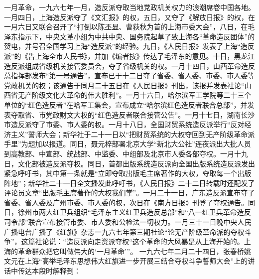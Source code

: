 \begin{maonote}
一月革命，一九六七年一月，造反派夺取当地党政机关权力的浪潮席卷中国各地。一月四日，上海造反派夺了《文汇报》的权，五日，又夺了《解放日报》的权，在一月六日又联合召开了“打倒以陈丕显、曹荻秋为首的上海市委大会”，八日，在毛泽东指示下，中央文革小组为中共中央、国务院起草了致上海各“革命造反团体”的贺电，并号召全国学习上海“造反派”的经验。九日，《人民日报》发表了上海“造反派”的《告上海全市人民书》，并加《编者按》传达了毛泽东的意见。十日，黑龙江造反派组成省级机关接管委员会，夺了省级机关的权。一月十四日，山西革命造反总指挥部发布“第一号通告”，宣布已于十二日夺了省委、省人委、市委、市人委等党政机关的权；该通告于同月二十五日在《人民日报》刊出，该报并发表社论“山西省无产阶级文化大革命的伟大胜利”。一月十六日，哈尔滨军工学院等二十三个单位的“红色造反者”在哈军工集会，宣布成立“哈尔滨红色造反者联合总部”，并发表夺取省、市党政财文大权的“红色造反者联合接管公告”。一月十七日，湖南长沙市造反派夺了市委、市人委的权。一月十八日，全国财贸系统造反派举行“反对经济主义”誓师大会；新华社于二十一日以“把财贸系统的大权夺回到无产阶级革命派手里”为题加以报道。同日，聂元梓部署北京大学“新北大公社”连夜派出大批人员到高教部、中宣部、统战部、中监委、中组部及北京市人委各部夺权。一月十九日，文化部被造反派夺权。同日，首都出版系统造反派向全国出版系统造反派发出紧急呼吁书，其中第一条就是“立即夺取出版毛主席著作的大权，夺取每一个出版阵地”；新华社二十一日全文播发此呼吁书，《人民日报》二十二日转载时还配发了评论员文章“出版毛主席著作的大权我们掌”。一月二十一日，广东造反派宣布夺了省委、省人委及广州市委、市人委的权，次日在《南方日报》刊登了夺权通告。同日，徐州市两大红卫兵组织“毛泽东主义红卫兵造反总部”和“八一红卫兵革命造反司令部”联合宣布接管市委、市人委和公检法一切权力。一月三十一日晚中央人民广播电台广播了《红旗》杂志一九六七年第三期社论“论无产阶级革命派的夺权斗争”，这篇社论说：“造反派向走资派夺权“这个革命的大风暴是从上海开始的。上海的革命群众把它叫做伟大的‘一月革命’”。
一九六七年二月二十四日，张春桥姚文元在上海“高举毛泽东思想伟大红旗进一步开展三结合夺权斗争誓师大会”上的讲话中传达本段时解释到：


\end{maonote}
